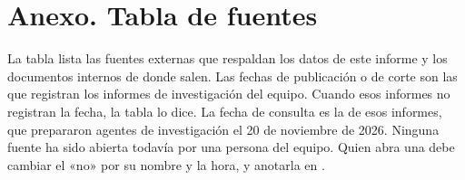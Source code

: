 \clearpage
\section*{Anexo. Tabla de fuentes}

La tabla lista las fuentes externas que respaldan los datos de este informe y los documentos internos de donde salen. Las fechas de publicación o de corte son las que registran los informes de investigación del equipo. Cuando esos informes no registran la fecha, la tabla lo dice. La fecha de consulta es la de esos informes, que prepararon agentes de investigación el 20 de noviembre de 2026. Ninguna fuente ha sido abierta todavía por una persona del equipo. Quien abra una debe cambiar el «no» por su nombre y la hora, y anotarla en .

